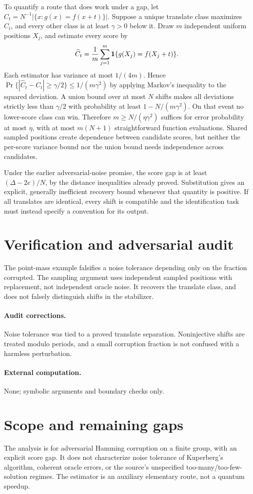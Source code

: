 \documentclass[11pt]{article}
\begin{document}
To quantify a route that does work under a gap, let $C_t=N^{-1}|\{x:g(x)=f(x+t)\}|$. Suppose a unique translate class maximizes $C_t$, and every other class is at least $\gamma>0$ below it. Draw $m$ independent uniform positions $X_j$, and estimate every score by
\[
 \widehat C_t={1\over m}\sum_{j=1}^m\mathbf1\{g(X_j)=f(X_j+t)\}.
\]
Each estimator has variance at most $1/(4m)$. Hence
$\Pr\{|\widehat C_t-C_t|\geq\gamma/2\}\leq1/(m\gamma^2)$ by applying Markov's inequality to the squared deviation. A union bound over at most $N$ shifts makes all deviations strictly less than $\gamma/2$ with probability at least $1-N/(m\gamma^2)$. On that event no lower-score class can win. Therefore $m\geq N/(\eta\gamma^2)$ suffices for error probability at most $\eta$, with at most $m(N+1)$ straightforward function evaluations. Shared sampled positions create dependence between candidate scores, but neither the per-score variance bound nor the union bound needs independence across candidates.

Under the earlier adversarial-noise promise, the score gap is at least $(\Delta-2e)/N$, by the distance inequalities already proved. Substitution gives an explicit, generally inefficient recovery bound whenever that quantity is positive. If all translates are identical, every shift is compatible and the identification task must instead specify a convention for its output.
\section{Verification and adversarial audit}
The point-mass example falsifies a noise tolerance depending only on the fraction corrupted. The sampling argument uses independent sampled positions with replacement, not independent oracle noise. It recovers the translate class, and does not falsely distinguish shifts in the stabilizer.
\paragraph{Audit corrections.} Noise tolerance was tied to a proved translate separation. Noninjective shifts are treated modulo periods, and a small corruption fraction is not confused with a harmless perturbation.
\paragraph{External computation.} None; symbolic arguments and boundary checks only.
\section{Scope and remaining gaps}
The analysis is for adversarial Hamming corruption on a finite group, with an explicit score gap. It does not characterize noise tolerance of Kuperberg's algorithm, coherent oracle errors, or the source's unspecified too-many/too-few-solution regimes. The estimator is an auxiliary elementary route, not a quantum speedup.
\end{document}
